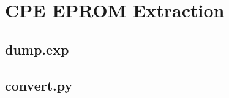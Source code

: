 \section{CPE EPROM Extraction}
\label{appendix:cpe_eprom_ext}

\subsection{dump.exp}


\subsection{convert.py}


